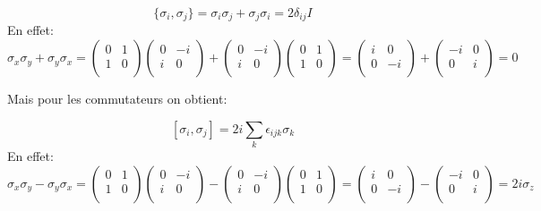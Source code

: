 \documentclass[12pt,a4paper]{article}
\begin{document}
	\[
		\boxed{ \{\sigma_i,\sigma_j\}=\sigma_i\sigma_j+\sigma_j\sigma_i=2 \delta_{ij} I}
	\]
	En effet:
	\[
	\sigma_x\sigma_y+\sigma_y\sigma_x=\begin{pmatrix}
	0&1\\
	1&0\\
	\end{pmatrix}
	\begin{pmatrix}
	0&-i\\
	i&0\\
	\end{pmatrix}
	+
	\begin{pmatrix}
	0&-i\\
	i&0\\
	\end{pmatrix}
	\begin{pmatrix}
	0&1\\
	1&0\\
	\end{pmatrix}	
	=
	\begin{pmatrix}
	i&0\\
	0&-i\\
	\end{pmatrix}
	+
	\begin{pmatrix}
	-i&0\\
	0&i\\
	\end{pmatrix}
	=0
	\]
	
	Mais pour les commutateurs on obtient:
	
	\[
	\boxed{[\sigma_i,\sigma_j]=2i \sum_k \epsilon_{ijk}\sigma_k}
	\]
	En effet:
	\[
	\sigma_x\sigma_y-\sigma_y\sigma_x=\begin{pmatrix}
	0&1\\
	1&0\\
	\end{pmatrix}
	\begin{pmatrix}
	0&-i\\
	i&0\\
	\end{pmatrix}
	-
	\begin{pmatrix}
	0&-i\\
	i&0\\
	\end{pmatrix}
	\begin{pmatrix}
	0&1\\
	1&0\\
	\end{pmatrix}	
	=
	\begin{pmatrix}
	i&0\\
	0&-i\\
	\end{pmatrix}
	-
	\begin{pmatrix}
	-i&0\\
	0&i\\
	\end{pmatrix}
	=2i \sigma_z
	\]
	
\end{document}

